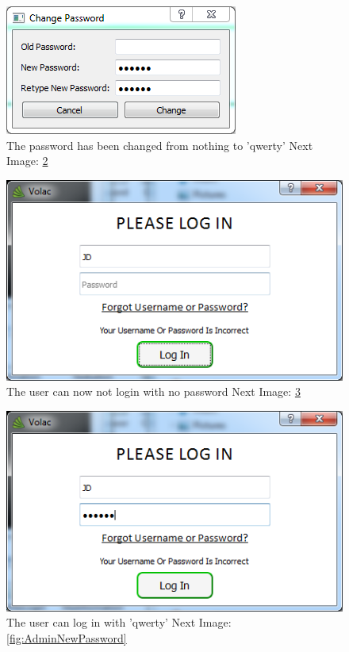 \begin{figure}[H]
    \includegraphics[width=\textwidth]{./Testing/Images/ChangedPassword.png}
    \caption{The password has been changed from nothing to 'qwerty'  Next Image: \ref{fig:ChangedPasswordOld}} \label{fig:ChangedPassword}
\end{figure}

\begin{figure}[H]
    \includegraphics[width=\textwidth]{./Testing/Images/ChangedPasswordOld.png}
    \caption{The user can now not login with no password  Next Image: \ref{fig:ChangePasswordNew}} \label{fig:ChangedPasswordOld}
\end{figure}

\begin{figure}[H]
    \includegraphics[width=\textwidth]{./Testing/Images/ChangePasswordNew.png}
    \caption{The user can log in with 'qwerty' Next Image: \ref{fig:AdminNewPassword}} \label{fig:ChangePasswordNew}
\end{figure}

